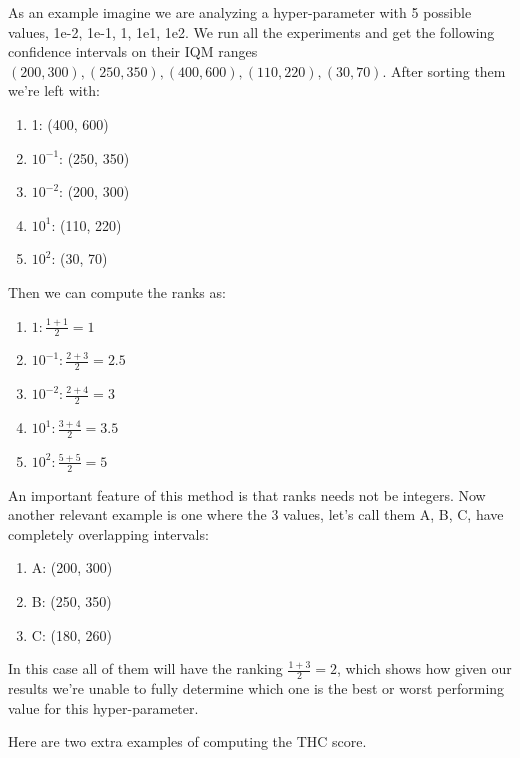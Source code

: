 As an example imagine we are analyzing a hyper-parameter with 5 possible values, 1e-2, 1e-1, 1, 1e1, 1e2. We run all the experiments and get the following confidence intervals on their IQM ranges $(200, 300), (250, 350), (400, 600), (110, 220), (30, 70)$. 
After sorting them we're left with: 
\begin{enumerate}
    \item 1: (400, 600)
    \item $10^{-1}$: (250, 350)
    \item $10^{-2}$: (200, 300)
    \item $10^1$: (110, 220)
    \item $10^2$: (30, 70)
\end{enumerate}
Then we can compute the ranks as: 
\begin{enumerate}
    \item $1: \frac{1 + 1}{2} = 1$
    \item $10^{-1}: \frac{2 + 3}{2} = 2.5$
    \item $10^{-2}: \frac{2 + 4}{2} = 3$
    \item $10^1: \frac{3 + 4}{2} = 3.5$
    \item $10^2: \frac{5 + 5}{2} = 5$
\end{enumerate}
An important feature of this method is that ranks needs not be integers. Now another relevant example is one where the 3 values, let's call them A, B, C, have completely overlapping intervals: \begin{enumerate}
    \item A: (200, 300)
    \item B: (250, 350)
    \item C: (180, 260)
\end{enumerate}
In this case all of them will have the ranking $\frac{1+3}{2} = 2$, which shows how given our results we're unable to fully determine which one is the best or worst performing value for this hyper-parameter. 

Here are two extra examples of computing the THC score.

